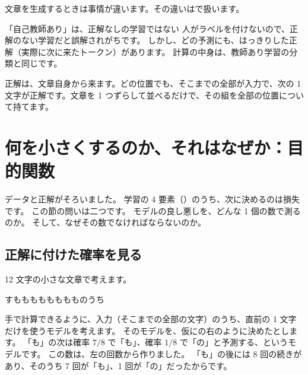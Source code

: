 文章を生成するときは事情が違います。その違いはで扱います。

\begin{caution}{「自己教師あり」は、正解なしの学習ではない}
人がラベルを付けないので、正解のない学習だと誤解されがちです。
しかし、どの予測にも、はっきりした正解（実際に次に来たトークン）があります。
計算の中身は、教師あり学習の分類と同じです。
\end{caution}

正解は、文章自身から来ます。どの位置でも、そこまでの全部が入力で、次の 1 文字が正解です。文章を 1 つずらして並べるだけで、その組を全部の位置について持てます。

\section{何を小さくするのか、それはなぜか：目的関数}\label{sec:lm-objective}

データと正解がそろいました。
学習の 4 要素（）のうち、次に決めるのは損失です。
この節の問いは二つです。
モデルの良し悪しを、どんな 1 個の数で測るのか。
そして、なぜその数でなければならないのか。

\subsection*{正解に付けた確率を見る}

12 文字の小さな文章で考えます。
\begin{center}
すもももももももものうち
\end{center}
手で計算できるように、入力（そこまでの全部の文字）のうち、直前の 1 文字だけを使うモデルを考えます。
そのモデルを、仮にの右のように決めたとします。
「も」の次は確率 $7/8$ で「も」、確率 $1/8$ で「の」と予測する、というモデルです。
この数は、左の回数から作りました。
「も」の後には 8 回の続きがあり、そのうち 7 回が「も」、1 回が「の」だったからです。

